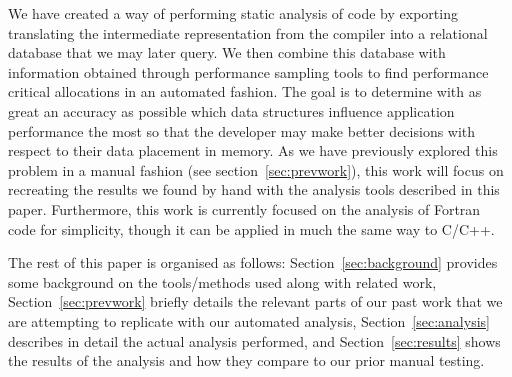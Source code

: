 We have created a way of performing static analysis of code by exporting translating the intermediate representation from the compiler into a relational database that we may later query. %
We then combine this database with information obtained through performance sampling tools to find performance critical allocations in an automated fashion.
The goal is to determine with as great an accuracy as possible which data structures influence application performance the most so that the developer may make better decisions with respect to their data placement in memory.
As we have previously explored this problem in a manual fashion (see section~\ref{sec:prevwork})\cite{Doudali:2017:CTE:3132402.3132418}, this work will focus on recreating the results we found by hand with the analysis tools described in this paper.
Furthermore, this work is currently focused on the analysis of Fortran code for simplicity, though it can be applied in much the same way to C/C++.

The rest of this paper is organised as follows: Section~\ref{sec:background} provides some background on the tools/methods used along with related work, Section~\ref{sec:prevwork} briefly details the relevant parts of our past work that we are attempting to replicate with our automated analysis, Section~\ref{sec:analysis} describes in detail the actual analysis performed, and Section~\ref{sec:results} shows the results of the analysis and how they compare to our prior manual testing.%
